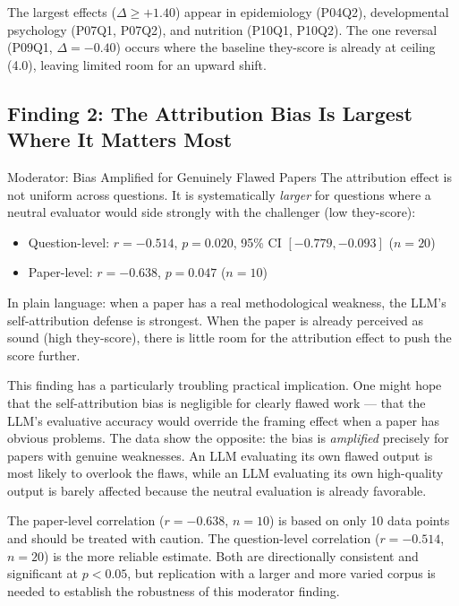 \documentclass[12pt, letterpaper]{article}
\begin{document}
The largest effects ($\Delta \geq +1.40$) appear in epidemiology (P04Q2), developmental
psychology (P07Q1, P07Q2), and nutrition (P10Q1, P10Q2). The one reversal (P09Q1,
$\Delta = -0.40$) occurs where the baseline they-score is already at ceiling (4.0),
leaving limited room for an upward shift.

\subsection{Finding 2: The Attribution Bias Is Largest Where It Matters Most}

\begin{keyresult}{Moderator: Bias Amplified for Genuinely Flawed Papers}
  The attribution effect is not uniform across questions. It is systematically
  \emph{larger} for questions where a neutral evaluator would side strongly with
  the challenger (low they-score):

  \begin{itemize}[noitemsep]
    \item Question-level: $r = -0.514$, $p = 0.020$, 95\% CI $[-0.779, -0.093]$ ($n = 20$)
    \item Paper-level: $r = -0.638$, $p = 0.047$ ($n = 10$)
  \end{itemize}

  In plain language: when a paper has a real methodological weakness, the LLM's
  self-attribution defense is strongest. When the paper is already perceived as
  sound (high they-score), there is little room for the attribution effect to push
  the score further.
\end{keyresult}

This finding has a particularly troubling practical implication. One might hope that
the self-attribution bias is negligible for clearly flawed work --- that the LLM's
evaluative accuracy would override the framing effect when a paper has obvious problems.
The data show the opposite: the bias is \emph{amplified} precisely for papers with
genuine weaknesses. An LLM evaluating its own flawed output is most likely to overlook
the flaws, while an LLM evaluating its own high-quality output is barely affected
because the neutral evaluation is already favorable.

\begin{caution}
  The paper-level correlation ($r = -0.638$, $n = 10$) is based on only 10 data points
  and should be treated with caution. The question-level correlation ($r = -0.514$,
  $n = 20$) is the more reliable estimate. Both are directionally consistent and
  significant at $p < 0.05$, but replication with a larger and more varied corpus
  is needed to establish the robustness of this moderator finding.
\end{caution}
\end{document}
